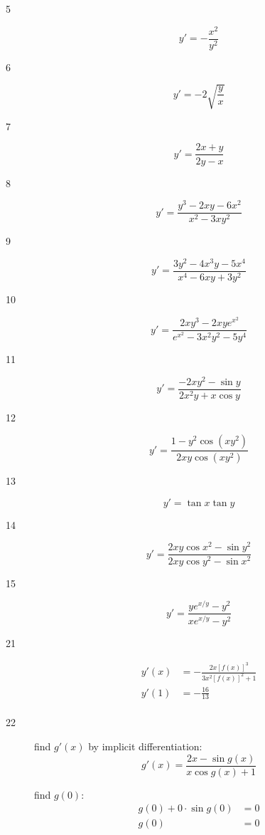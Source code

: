 \documentclass[letterpaper, landscape]{exam}
\begin{document}
  \begin{description}

    \item[5] 
      \[
        y' = - \frac{x^2}{y^2} 
      \]

    \item[6] 
      \[
        y' = -2 \sqrt{\frac{y}{x}}
      \]

    \item[7] 
      \[
        y' = \frac{2x + y}{2y - x}
      \]

    \item[8] 
      \[
        y' = \frac{ y^3 - 2xy - 6x^2 }{ x^2 - 3xy^2 } 
      \]

    \item[9] 
      \[
        y' = \frac{ 3y^2 - 4x^3y- 5x^4 }{x^4 - 6xy + 3y^2}
      \]

    \item[10] 
      \[
        y' = \frac{ 2xy^3 - 2xye^{x^2} }{ e^{x^2} - 3x^2y^2 - 5y^4}
      \]

    \item[11] 
      \[
        y' = \frac{ - 2x y^2 - \sin y}{2x^2y + x \cos y}
      \]

    \item[12] 
      \[
        y' = \frac{ 1 - y^2 \cos \left( xy^2 \right) }{2xy \cos \left( xy^2 \right)}
      \]

    \item[13] 
      \[
        y' = \tan x \tan y
      \]

    \item[14] 
      \[
        y' = \frac{2x y \cos x^2 - \sin y^2}{2x y \cos y^2 - \sin x^2}
      \]

    \item[15] 
      \[
        y' = \frac{ ye^{x/y} - y^2 }{ x e^{x/y} - y^2 }
      \]

    \item[21] 
      \begin{align*}
        y'(x) & = - \frac{2x [f(x)]^3}{3x^2 [f(x)]^2 + 1} \\
        y'(1) & = \boxed{ - \frac{16}{13} } \\
      \end{align*}

    \item[22] 
      find $g'(x)$ by implicit differentiation:
      \[
        g'(x) = \frac{2x - \sin g(x) }{x \cos g(x) + 1}
      \]

      find $g(0)$:
      \begin{align*}
        g(0) + 0 \cdot \sin g(0) & = 0 \\
        g(0)                     & = 0 \\
      \end{align*}


\end{description}
\end{document}

